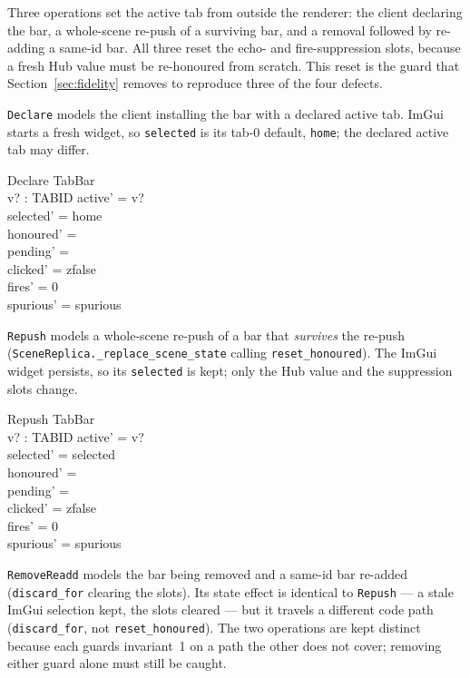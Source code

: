 \documentclass[a4paper,10pt,fleqn]{article}
\begin{document}
Three operations set the active tab from outside the renderer: the client
declaring the bar, a whole-scene re-push of a surviving bar, and a removal
followed by re-adding a same-id bar.  All three reset the echo- and
fire-suppression slots, because a fresh Hub value must be re-honoured from
scratch.  This reset is the guard that Section~\ref{sec:fidelity} removes to
reproduce three of the four defects.

\texttt{Declare} models the client installing the bar with a declared active
tab.  ImGui starts a fresh widget, so \texttt{selected} is its tab-0 default,
\texttt{home}; the declared active tab may differ.

\begin{schema}{Declare}
  \Delta TabBar \\
  v? : TABID
\where
  active' = v? \\
  selected' = home \\
  honoured' = \emptyset \\
  pending' = \emptyset \\
  clicked' = zfalse \\
  fires' = 0 \\
  spurious' = spurious
\end{schema}

\texttt{Repush} models a whole-scene re-push of a bar that \emph{survives} the
re-push (\texttt{SceneReplica.\_replace\_scene\_state} calling
\texttt{reset\_honoured}).  The ImGui widget persists, so its \texttt{selected}
is kept; only the Hub value and the suppression slots change.

\begin{schema}{Repush}
  \Delta TabBar \\
  v? : TABID
\where
  active' = v? \\
  selected' = selected \\
  honoured' = \emptyset \\
  pending' = \emptyset \\
  clicked' = zfalse \\
  fires' = 0 \\
  spurious' = spurious
\end{schema}

\texttt{RemoveReadd} models the bar being removed and a same-id bar re-added
(\texttt{discard\_for} clearing the slots).  Its state effect is identical to
\texttt{Repush} --- a stale ImGui selection kept, the slots cleared --- but it
travels a different code path (\texttt{discard\_for}, not
\texttt{reset\_honoured}).  The two operations are kept distinct because each
guards invariant~1 on a path the other does not cover; removing either guard
alone must still be caught.
\end{document}
